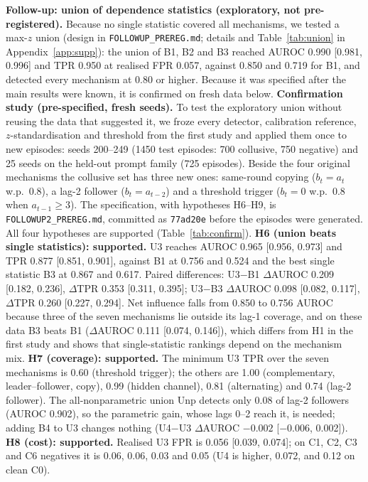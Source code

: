 \documentclass[11pt]{article}
\begin{document}
\textbf{Follow-up: union of dependence statistics (exploratory, not pre-registered).} Because no single statistic covered all mechanisms, we tested a max-$z$ union (design in \texttt{FOLLOWUP\_PREREG.md}; details and Table~\ref{tab:union} in Appendix~\ref{app:supp}): the union of B1, B2 and B3 reached AUROC 0.990 [0.981, 0.996] and TPR 0.950 at realised FPR 0.057, against 0.850 and 0.719 for B1, and detected every mechanism at 0.80 or higher. Because it was specified after the main results were known, it is confirmed on fresh data below.
\textbf{Confirmation study (pre-specified, fresh seeds).} To test the exploratory union without reusing the data that suggested it, we froze every detector, calibration reference, $z$-standardisation and threshold from the first study and applied them once to new episodes: seeds 200--249 (1450 test episodes: 700 collusive, 750 negative) and 25 seeds on the held-out prompt family (725 episodes). Beside the four original mechanisms the collusive set has three new ones: same-round copying ($b_t=a_t$ w.p.\ 0.8), a lag-2 follower ($b_t=a_{t-2}$) and a threshold trigger ($b_t=0$ w.p.\ 0.8 when $a_{t-1}\ge3$). The specification, with hypotheses H6--H9, is \texttt{FOLLOWUP2\_PREREG.md}, committed as \texttt{77ad20e} before the episodes were generated. All four hypotheses are supported (Table~\ref{tab:confirm}).
\textbf{H6 (union beats single statistics): supported.} U3 reaches AUROC 0.965 [0.956, 0.973] and TPR 0.877 [0.851, 0.901], against B1 at 0.756 and 0.524 and the best single statistic B3 at 0.867 and 0.617. Paired differences: U3$-$B1 $\Delta$AUROC 0.209 [0.182, 0.236], $\Delta$TPR 0.353 [0.311, 0.395]; U3$-$B3 $\Delta$AUROC 0.098 [0.082, 0.117], $\Delta$TPR 0.260 [0.227, 0.294]. Net influence falls from 0.850 to 0.756 AUROC because three of the seven mechanisms lie outside its lag-1 coverage, and on these data B3 beats B1 ($\Delta$AUROC 0.111 [0.074, 0.146]), which differs from H1 in the first study and shows that single-statistic rankings depend on the mechanism mix.
\textbf{H7 (coverage): supported.} The minimum U3 TPR over the seven mechanisms is 0.60 (threshold trigger); the others are 1.00 (complementary, leader--follower, copy), 0.99 (hidden channel), 0.81 (alternating) and 0.74 (lag-2 follower). The all-nonparametric union Unp detects only 0.08 of lag-2 followers (AUROC 0.902), so the parametric gain, whose lags 0--2 reach it, is needed; adding B4 to U3 changes nothing (U4$-$U3 $\Delta$AUROC $-0.002$ [$-0.006$, 0.002]).
\textbf{H8 (cost): supported.} Realised U3 FPR is 0.056 [0.039, 0.074]; on C1, C2, C3 and C6 negatives it is 0.06, 0.06, 0.03 and 0.05 (U4 is higher, 0.072, and 0.12 on clean C0).
\end{document}
